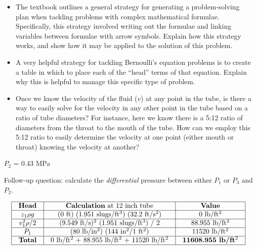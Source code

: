 \begin{itemize}
\item{} The textbook outlines a general strategy for generating a problem-solving plan when tackling problems with complex mathematical formulae.  Specifically, this strategy involved writing out the formulae and linking variables between formulae with arrow symbols.  Explain how this strategy works, and show how it may be applied to the solution of this problem.
\item{} A very helpful strategy for tackling Bernoulli's equation problems is to create a table in which to place each of the ``head'' terms of that equation.  Explain why this is helpful to manage this specific type of problem.
\item{} Once we know the velocity of the fluid ($v$) at any point in the tube, is there a way to easily solve for the velocity in any other point in the tube based on a ratio of tube diameters?  For instance, here we know there is a 5:12 ratio of diameters from the throat to the mouth of the tube.  How can we employ this 5:12 ratio to easily determine the velocity at one point (either mouth or throat) knowing the velocity at another?
\end{itemize}







$P_2$ = 0.43 MPa     

\vskip 10pt


Follow-up question: calculate the {\it differential} pressure between either $P_1$ or $P_3$ and $P_2$.








$$\vbox{\offinterlineskip
\halign{\strut
\vrule \quad\hfil # \ \hfil & 
\vrule \quad\hfil # \ \hfil & 
\vrule \quad\hfil # \ \hfil \vrule \cr
\noalign{\hrule}
%
{\bf Head} & {\bf Calculation} at 12 inch tube & {\bf Value} \cr
%
\noalign{\hrule}
%
$z_1 \rho g$ & (0 ft) (1.951 slugs/ft$^{3}$) (32.2 ft/s$^{2}$) & 0 lb/ft$^{2}$ \cr
%
\noalign{\hrule}
%
$v_1^2 \rho / 2$ & (9.549 ft/s)$^{2}$ (1.951 slugs/ft$^{3}$) / 2 & 88.955 lb/ft$^{2}$ \cr
%
\noalign{\hrule}
%
$P_1$ & (80 lb/in$^{2}$) (144 in$^{2}$/1 ft$^{2}$) & 11520 lb/ft$^{2}$ \cr
%
\noalign{\hrule}
%
{\bf Total} &  0 lb/ft$^{2}$ + 88.955 lb/ft$^{2}$ + 11520 lb/ft$^{2}$ & {\bf 11608.955 lb/ft$^{2}$} \cr
%
\noalign{\hrule}
} %
}$$ %

